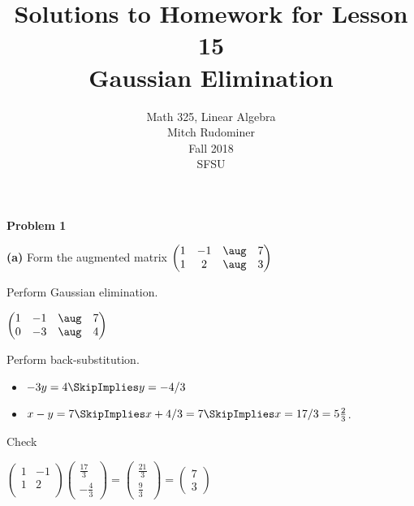 \documentclass[oneside,12pt]{amsart}
\begin{document}
\title{Solutions to Homework for Lesson 15 \\ Gaussian Elimination}
\author{Math 325, Linear Algebra \\ Mitch Rudominer \\ Fall 2018 \\ SFSU }
\date{}

\maketitle


\textbf{Problem 1}

\bigskip


\textbf{(a)} Form the augmented matrix
$
\begin{pmatrix}
 1 & -1 &  \aug & 7  \\
 1 &  2 &  \aug & 3  \\
\end{pmatrix}
$

Perform Gaussian elimination.


\bigskip

$
\begin{pmatrix}
 1 & -1 &  \aug & 7  \\
 0 & -3 &  \aug & 4  \\
\end{pmatrix}
$


\bigskip

Perform back-substitution.

\begin{itemize}
\item $-3y = 4  \SkipImplies y = -4/3$
\item $x-y=7 \SkipImplies x+4/3=7 \SkipImplies x = 17/3 = 5 \frac{2}{3}$.
\end{itemize}

\bigskip

Check

\bigskip

$
\begin{pmatrix}
 1 & -1 \\
 1 & 2 \\
\end{pmatrix}
\begin{pmatrix}
 \frac{17}{3} \\[6pt]
 -\frac{4}{3}
\end{pmatrix}
=
\begin{pmatrix}
 \frac{21}{3} \\[6pt]
 \frac{9}{3}
\end{pmatrix}
=
\begin{pmatrix}
 7 \\
3
\end{pmatrix}
$
\end{document}
